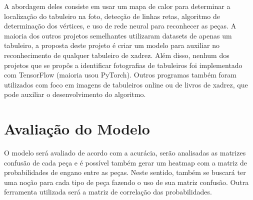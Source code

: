 \documentclass[a4paper,12pt,twoside]{article}
\begin{document}
A abordagem deles consiste em usar um mapa de calor para determinar a localização do tabuleiro na foto,
detecção de linhas retas, algoritmo de determinação dos vértices, e uso de rede neural para reconhecer as peças.
A maioria dos outros projetos semelhantes utilizaram datasets de apenas um tabuleiro,
a proposta deste projeto é criar um modelo para auxiliar no reconhecimento de qualquer tabuleiro de xadrez.
Além disso, nenhum dos projetos que se propôs a identificar fotografias de tabuleiros foi implementado com TensorFlow
(maioria usou PyTorch).
Outros programas também foram utilizados com foco em imagens de tabuleiros online ou de livros de xadrez,
que pode auxiliar o desenvolvimento do algoritmo.

\section{Avaliação do Modelo}
O modelo será avaliado de acordo com a acurácia,
serão analisadas as matrizes confusão de cada peça e é possível também gerar um
heatmap com a matriz de probabilidades de engano entre as peças.
Neste sentido, também se buscará ter uma noção para cada tipo de peça fazendo o uso de sua matriz confusão.
Outra ferramenta utilizada será a matriz de correlação das probabilidades.

\nocite{*}
\printbibliography
\end{document}
